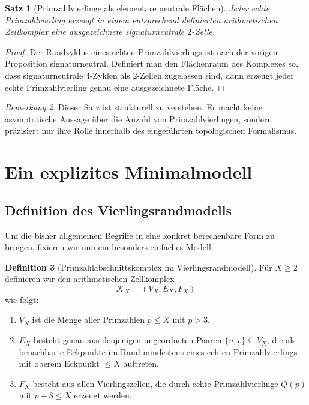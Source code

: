 \documentclass[11pt,a4paper]{article}
\newtheorem{theorem}{Satz}[section]
\theoremstyle{definition}
\newtheorem{definition}[theorem]{Definition}
\theoremstyle{remark}
\newtheorem{remark}[theorem]{Bemerkung}
\newcommand{\VX}{V_X}
\newcommand{\EX}{E_X}
\newcommand{\FX}{F_X}
\newcommand{\KX}{\mathcal{K}_X}
\begin{document}
	\begin{theorem}[Primzahlvierlinge als elementare neutrale Flächen]
		Jeder echte Primzahlvierling erzeugt in einem entsprechend definierten arithmetischen Zellkomplex eine ausgezeichnete signaturneutrale $2$-Zelle.
	\end{theorem}
	
	\begin{proof}
		Der Randzyklus eines echten Primzahlvierlings ist nach der vorigen Proposition signaturneutral. Definiert man den Flächenraum des Komplexes so, dass signaturneutrale $4$-Zyklen als $2$-Zellen zugelassen sind, dann erzeugt jeder echte Primzahlvierling genau eine ausgezeichnete Fläche.
	\end{proof}
	
	\begin{remark}
		Dieser Satz ist strukturell zu verstehen. Er macht keine asymptotische Aussage über die Anzahl von Primzahlvierlingen, sondern präzisiert nur ihre Rolle innerhalb des eingeführten topologischen Formalismus.
	\end{remark}
	
	\section{Ein explizites Minimalmodell}
	
	\subsection{Definition des Vierlingsrandmodells}
	
	Um die bisher allgemeinen Begriffe in eine konkret berechenbare Form zu bringen, fixieren wir nun ein besonders einfaches Modell.
	
	\begin{definition}[Primzahlabschnittskomplex im Vierlingsrandmodell]
		Für $X\ge 2$ definieren wir den arithmetischen Zellkomplex
		\[
		\KX=(\VX,\EX,\FX)
		\]
		wie folgt:
		\begin{enumerate}[label=(\roman*),itemsep=0.2em]
			\item $\VX$ ist die Menge aller Primzahlen $p\le X$ mit $p>3$.
			\item $\EX$ besteht genau aus denjenigen ungeordneten Paaren $\{u,v\}\subseteq \VX$, die als benachbarte Eckpunkte im Rand mindestens eines echten Primzahlvierlings mit oberem Eckpunkt $\le X$ auftreten.
			\item $\FX$ besteht aus allen Vierlingszellen, die durch echte Primzahlvierlinge $Q(p)$ mit $p+8\le X$ erzeugt werden.
		\end{enumerate}
	\end{definition}
	
\end{document}
